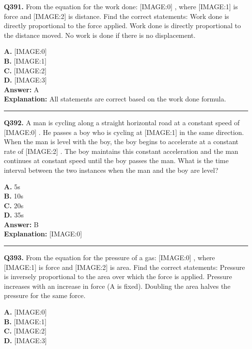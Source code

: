 \documentclass[12pt]{article}
\begin{document}
\noindent
\textbf{Q391.} From the equation for the work done:
[IMAGE:0]
, where
[IMAGE:1]
is force and
[IMAGE:2]
is distance. Find the correct statements:
Work done is directly proportional to the force applied.
Work done is directly proportional to the distance moved.
No work is done if there is no displacement.



\textbf{A.} [IMAGE:0] \\
\textbf{B.} [IMAGE:1] \\
\textbf{C.} [IMAGE:2] \\
\textbf{D.} [IMAGE:3] \\

\textbf{Answer:} A \\
\textbf{Explanation:} All statements are correct based on the work done formula.

\hrule
\vspace{1em}


\noindent
\textbf{Q392.} A man is cycling along a straight horizontal road at a constant speed of
[IMAGE:0]
. He passes a boy who is cycling at
[IMAGE:1]
in the same direction. When the man is level with the boy, the boy begins to accelerate at a constant rate of
[IMAGE:2]
. The boy maintains this constant acceleration and the man continues at constant speed until the boy passes the man. What is the time interval between the two instances when the man and the boy are level?



\textbf{A.} 5s \\
\textbf{B.} 10s \\
\textbf{C.} 20s \\
\textbf{D.} 35s \\

\textbf{Answer:} B \\
\textbf{Explanation:} [IMAGE:0]

\hrule
\vspace{1em}


\noindent
\textbf{Q393.} From the equation for the pressure of a gas:
[IMAGE:0]
, where
[IMAGE:1]
is force and
[IMAGE:2]
is area. Find the correct statements:
Pressure is inversely proportional to the area over which the force is applied.
Pressure increases with an increase in force (A is fixed).
Doubling the area halves the pressure for the same force.



\textbf{A.} [IMAGE:0] \\
\textbf{B.} [IMAGE:1] \\
\textbf{C.} [IMAGE:2] \\
\textbf{D.} [IMAGE:3] \\
\end{document}
